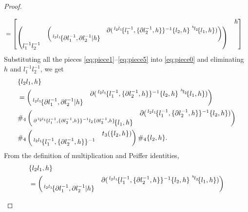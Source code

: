 \documentclass[11pt, reqno]{amsart} %
\newcommand{\act}[1]{\,\sp{#1}\!}
\theoremstyle{definition}
\theoremstyle{remark}
\numberwithin{equation}{section}
\begin{document}
\begin{proof}
\begin{enumerate}
\begin{align}
    \label{eq:piece5}
    &= 
    \begin{bmatrix} & h \\ \begin{pmatrix} & \begin{pmatrix} & \partial(\act{l_2l_1}\{l_1^{-1},\{\partial l_2^{-1},h\}\}^{-1}\{l_2,h\}\act{\act{h}l_2}\{l_1,h\}) \\ \act{l_2l_1}\{\partial l_1^{-1},\partial l_2^{-1}|h\} & \end{pmatrix} \\ l_1^{-1}l_2^{-1} & \end{pmatrix} &\end{bmatrix}
  \end{align}
  Substituting all the pieces \eqref{eq:piece1}--\eqref{eq:piece5} into \eqref{eq:piece0} and eliminating $h$ and $l_1^{-1}l_2^{-1}$, we get
  \begin{align*}
    &
    \{l_2l_1,h\} \\
    &= 
    \begin{pmatrix} & \partial(\act{l_2l_1}\{l_1^{-1},\{\partial l_2^{-1},h\}\}^{-1}\{l_2,h\}\act{\act{h}l_2}\{l_1,h\}) \\ \act{l_2l_1}\{\partial l_1^{-1},\partial l_2^{-1}|h\} & \end{pmatrix} \\
    &\#_4
    \begin{pmatrix} & \partial(\act{l_2l_1}\{l_1^{-1},\{\partial l_2^{-1},h\}\}^{-1}\{l_2,h\}) \\ \act{\partial\act{l_2l_1}\{l_1^{-1},\{\partial l_2^{-1},h\}\}^{-1}l_2\{\partial l_2^{-1},h\}}\{l_1,h\} &\end{pmatrix} \\
    &\#_4
    \begin{pmatrix} & t_3(\{l_2,h\}) \\ \act{l_2l_1}\{l_1^{-1},\{\partial l_2^{-1},h\}\}^{-1} &\end{pmatrix}
    \#_4
    \{l_2,h\}.
  \end{align*}
  From the definition of multiplication and Peiffer identities, 
  \begin{align*}
    &
    \{l_2l_1,h\} \\
    &= 
    \begin{pmatrix} & \partial(\act{l_2l_1}\{l_1^{-1},\{\partial l_2^{-1},h\}\}^{-1}\{l_2,h\}\act{\act{h}l_2}\{l_1,h\}) \\ \act{l_2l_1}\{\partial l_1^{-1},\partial l_2^{-1}|h\} & \end{pmatrix} \\

\end{align*}
\end{enumerate}
\end{proof}
\end{document}
